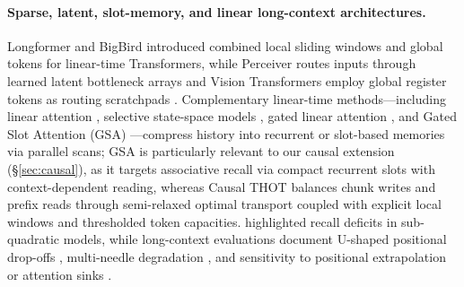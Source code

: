 \documentclass[11pt]{article}
\begin{document}
\paragraph{Sparse, latent, slot-memory, and linear long-context architectures.}
Longformer \citep{beltagy2020longformer} and BigBird \citep{zaheer2020bigbird} introduced combined local sliding windows and global tokens for linear-time Transformers, while Perceiver \citep{jaegle2021perceiver} routes inputs through learned latent bottleneck arrays and Vision Transformers employ global register tokens as routing scratchpads \citep{darcet2024vision}. Complementary linear-time methods---including linear attention \citep{katharopoulos2020transformers}, selective state-space models \citep{gu2024mamba}, gated linear attention \citep{yang2024gla}, and Gated Slot Attention (GSA) \citep{zhang2024gsa}---compress history into recurrent or slot-based memories via parallel scans; GSA is particularly relevant to our causal extension (\S\ref{sec:causal}), as it targets associative recall via compact recurrent slots with context-dependent reading, whereas Causal THOT balances chunk writes and prefix reads through semi-relaxed optimal transport coupled with explicit local windows and thresholded token capacities. \citet{arora2024zoology} highlighted recall deficits in sub-quadratic models, while long-context evaluations document U-shaped positional drop-offs \citep{liu2024lost}, multi-needle degradation \citep{hsieh2024ruler}, and sensitivity to positional extrapolation or attention sinks \citep{press2022train,peng2024yarn,xiao2024efficient}.
\end{document}

